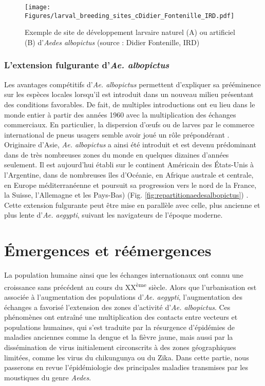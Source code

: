\begin{figure}[t]
	\centering
	\texttt{[image: Figures/larval\_breeding\_sites\_cDidier\_Fontenille\_IRD.pdf]}
	\caption{Exemple de site de développement larvaire naturel (A) ou artificiel (B) d'{\em Aedes albopictus} (source : Didier Fontenille, IRD)}
	\label{fig:larval_breeding}
\end{figure}

\subsubsection{L'extension fulgurante d'{\em Ae. albopictus}}

Les avantages compétitifs d'{\em Ae. albopictus} permettent d'expliquer sa prééminence sur les espèces locales lorsqu'il est introduit dans un nouveau milieu présentant des conditions favorables.
De fait, de multiples introductions ont eu lieu dans le monde entier à partir des années 1960 avec la multiplication des échanges commerciaux.
En particulier, la dispersion d'\oe ufs ou de larves par le commerce international de pneus usagers semble avoir joué un rôle prépondérant \cite{reiter1998aedes}.
Originaire d'Asie, {\em Ae. albopictus} a ainsi été introduit et est devenu prédominant dans de très nombreuses zones du monde en quelques dizaines d'années seulement.
Il est aujourd'hui établi sur le continent Américain des États-Unis à l'Argentine, dans de nombreuses îles d'Océanie, en Afrique australe et centrale, en Europe méditerranéenne et poursuit sa progression vers le nord de la France, la Suisse, l'Allemagne et les Pays-Bas) (Fig. \ref{fig:repartitionaedesalbopictus}) \cite{kraemer2015global}.
Cette extension fulgurante peut être mise en parallèle avec celle, plus ancienne et plus lente d'{\em Ae. aegypti}, suivant les navigateurs de l'époque moderne.


\section[Émergences \& réémergences]{Émergences et réémergences}

La population humaine ainsi que les échanges internationaux ont connu une croissance sans précédent au cours du XX\textsuperscript{ème} siècle.
Alors que l'urbanisation est associée à l'augmentation des populations d'{\em Ae. aegypti}, l'augmentation des échanges a favorisé l'extension des zones d'activité d'{\em Ae. albopictus}. 
Ces phénomènes ont entraîné une multiplication des contacts entre vecteurs et populations humaines, qui s'est traduite par la résurgence d'épidémies de maladies anciennes comme la dengue et la fièvre jaune, mais aussi par la dissémination de virus initialement circonscrits à des zones géographiques limitées, comme les virus du chikungunya ou du Zika.
Dans cette partie, nous passerons en revue l'épidémiologie des principales maladies transmises par les moustiques du genre {\em Aedes}.


